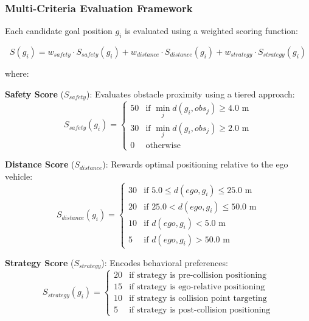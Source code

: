 \subsubsection{Multi-Criteria Evaluation Framework}

Each candidate goal position $g_i$ is evaluated using a weighted scoring function:

\begin{equation}
    S(g_i) = w_{safety} \cdot S_{safety}(g_i) + w_{distance} \cdot S_{distance}(g_i) + w_{strategy} \cdot S_{strategy}(g_i)
\end{equation}

where:

\textbf{Safety Score} ($S_{safety}$): Evaluates obstacle proximity using a tiered approach:
\begin{equation}
    S_{safety}(g_i) = \begin{cases}
        50 & \text{if } \min_{j} d(g_i, obs_j) \geq 4.0 \text{ m} \\
        30 & \text{if } \min_{j} d(g_i, obs_j) \geq 2.0 \text{ m} \\
        0 & \text{otherwise}
    \end{cases}
\end{equation}

\textbf{Distance Score} ($S_{distance}$): Rewards optimal positioning relative to the ego vehicle:
\begin{equation}
    S_{distance}(g_i) = \begin{cases}
        30 & \text{if } 5.0 \leq d(ego, g_i) \leq 25.0 \text{ m} \\
        20 & \text{if } 25.0 < d(ego, g_i) \leq 50.0 \text{ m} \\
        10 & \text{if } d(ego, g_i) < 5.0 \text{ m} \\
        5 & \text{if } d(ego, g_i) > 50.0 \text{ m}
    \end{cases}
\end{equation}

\textbf{Strategy Score} ($S_{strategy}$): Encodes behavioral preferences:
\begin{equation}
    S_{strategy}(g_i) = \begin{cases}
        20 & \text{if strategy is pre-collision positioning} \\
        15 & \text{if strategy is ego-relative positioning} \\
        10 & \text{if strategy is collision point targeting} \\
        5 & \text{if strategy is post-collision positioning}
    \end{cases}
\end{equation}


